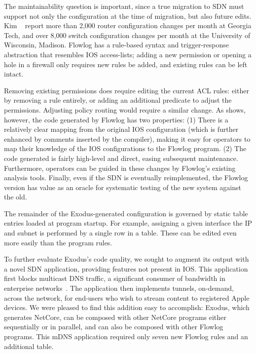 The maintainability question is important, since a true migration to SDN must
support not only the configuration at the time of migration, but also future
edits. Kim \etal~\cite{kim11evolution} report more than 2,000 router configuration changes per month
at Georgia Tech, and over 8,000 switch configuration changes per month
at the University of Wisconsin, Madison.
Flowlog has a rule-based syntax and trigger-response abstraction that
resembles IOS access-lists; adding a new permission or opening a
hole in a firewall only requires new rules be added, and existing rules can be
left intact. 

Removing existing permissions does require editing the
current ACL rules: either by removing a rule entirely, or adding an
additional predicate to adjust the permissions.  Adjusting policy
routing would require a similar change. 
As  shows, however, the code generated
  by Flowlog has two properties: (1) There is a relatively clear
  mapping from the original IOS configuration (which is further
  enhanced by comments inserted by the compiler), making it easy for
  operators to map their knowledge of the IOS configurations to the
  Flowlog program. (2) The code generated is fairly
  high-level and direct, easing subsequent maintenance.
Furthermore, operators can
be guided in these changes by Flowlog's existing analysis tools.
Finally, even if the SDN is eventually reimplemented, the Flowlog
version has value as an oracle for systematic testing of the new
system against the old.

The remainder of the Exodus-generated configuration is governed by static table
entries loaded at program startup. For example, assigning a given interface
the IP and subnet  is performed by a single row in a
table. These can be edited even more easily than the program rules.

To further evaluate Exodus's code quality, we sought to augment its output
with a novel SDN application, providing features not present in IOS.
This application first blocks multicast DNS traffic, a significant consumer of
bandwidth in enterprise networks~\cite{Casado07Ethane}.
The application then implements tunnels, on-demand, across the network, for end-users who wish to stream
content to registered Apple devices. We were pleased to find this addition
easy to accomplish: Exodus, which generates NetCore, can be composed
with other NetCore programs either sequentially or in parallel, and can also
be composed with other Flowlog programs. This mDNS application required
only seven new Flowlog rules and an additional table.

